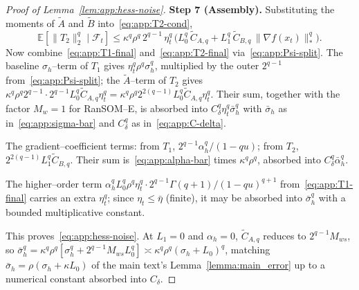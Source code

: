 \documentclass[10pt,a4paper]{amsart}
\begin{document}
\begin{proof}[Proof of Lemma~\ref{lem:app:hess-noise}]
\smallskip\noindent\textbf{Step 7 (Assembly).}
Substituting the moments of $\widetilde A$ and $\widetilde B$
into~\eqref{eq:app:T2-cond},
\begin{equation}
  \mathbb{E}[\|T_2\|_2^q \mid \mathcal{F}_t]
  \leq \kappa^q \rho^q\, 2^{q-1}\, \eta_t^q\,
    \bigl(L_0^q\, \widetilde C_{A,q}
      + L_1^q\, \widetilde C_{B,q}\, \|\nabla f(x_t)\|_*^q\bigr).
  \label{eq:app:T2-final}
\end{equation}
Now combine~\eqref{eq:app:T1-final} and~\eqref{eq:app:T2-final}
via~\eqref{eq:app:Psi-split}. The baseline $\sigma_h$--term of $T_1$
gives $\eta_t^q\rho^q\sigma_h^q$, multiplied by the outer $2^{q-1}$
from~\eqref{eq:app:Psi-split}; the $\widetilde A$--term of $T_2$ gives
$\kappa^q\rho^q 2^{q-1}\cdot 2^{q-1} L_0^q\widetilde C_{A,q}\eta_t^q =
\kappa^q\rho^q 2^{2(q-1)} L_0^q \widetilde C_{A,q}\eta_t^q$. Their sum,
together with the factor $M_w = 1$ for RanSOM--E, is absorbed into
$C_\delta^q\eta_t^q\bar\sigma_h^q$ with $\bar\sigma_h$ as
in~\eqref{eq:app:sigma-bar} and $C_\delta^q$ as
in~\eqref{eq:app:C-delta}.

The gradient--coefficient terms: from $T_1$, $2^{q-1}\alpha_h^q/(1-qu)$;
from $T_2$, $2^{2(q-1)} L_1^q\widetilde C_{B,q}$. Their sum
is~\eqref{eq:app:alpha-bar} times $\kappa^q\rho^q$, absorbed into
$C_\delta^q\bar\alpha_h^q$.

The higher--order term $\alpha_h^q L_0^q\rho^q\eta_t^q \cdot
2^{q-1}\Gamma(q+1)/(1-qu)^{q+1}$ from~\eqref{eq:app:T1-final} carries an
extra $\eta_t^q$; since $\eta_t \leq \bar\eta$ (finite), it may be
absorbed into $\bar\sigma_h^q$ with a bounded multiplicative constant.

This proves~\eqref{eq:app:hess-noise}. At $L_1 = 0$ and $\alpha_h = 0$,
$\widetilde C_{A,q}$ reduces to $2^{q-1} M_{ws}$, so $\bar\sigma_h^q =
\kappa^q\rho^q[\sigma_h^q + 2^{q-1}M_{ws} L_0^q] \asymp
\kappa^q\rho^q(\sigma_h + L_0)^q$, matching $\bar\sigma_h = \rho(\sigma_h
+ \kappa L_0)$ of the main text's Lemma~\ref{lemma:main_error} up to a
numerical constant absorbed into $C_\delta$.
\end{proof}
\end{document}
